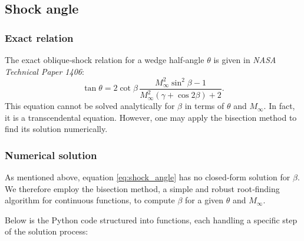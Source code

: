 \subsection{Shock angle}

\subsubsection{Exact relation}

The exact oblique‐shock relation for a wedge half‐angle \(\theta\) is given in \emph{NASA Technical Paper 1406}:
\begin{equation}
    \tan\theta
    = 2 \cot\beta
      \,\frac{M_\infty^2 \sin^2\beta - 1}
            {M_\infty^2(\gamma + \cos 2\beta) + 2}.
    \label{eq:shock_angle}
\end{equation}
This equation cannot be solved analytically for \(\beta\) in terms of \(\theta\) and \(M_\infty\). In fact, it is a transcendental equation. However, one may apply the bisection method to find its solution numerically.

\subsubsection{Numerical solution}

As mentioned above, equation \eqref{eq:shock_angle} has no closed‐form solution for \(\beta\). We therefore employ the bisection method, a simple and robust root‐finding algorithm for continuous functions, to compute \(\beta\) for a given \(\theta\) and \(M_\infty\).

Below is the Python code structured into functions, each handling a specific step of the solution process:

